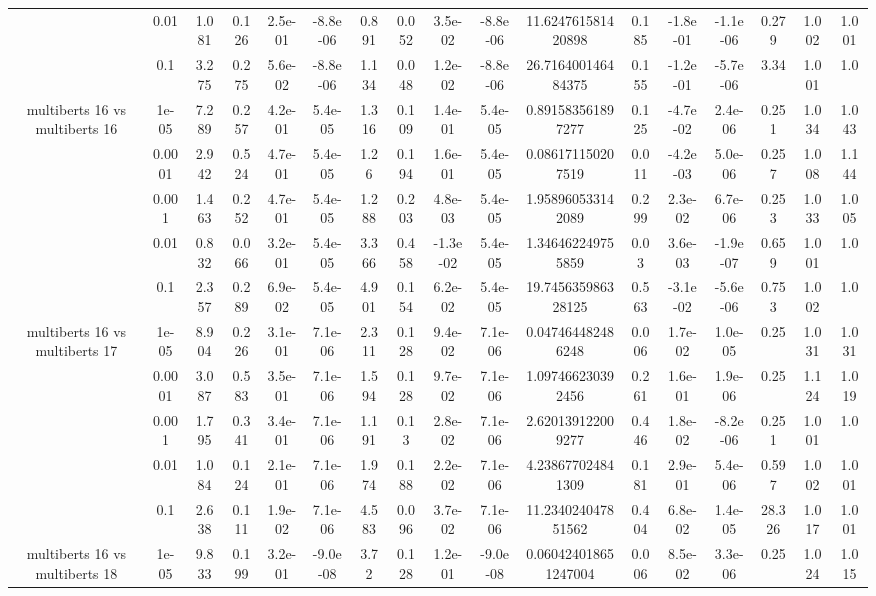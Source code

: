 \begin{tabular}{|c|c|c|c|c|c|c|c|c|c|c|c|c|c|c|c|c|}
 & 0.01 & 1.081 & 0.126 & 2.5e-01 & -8.8e-06 & 0.891 & 0.052 & 3.5e-02 & -8.8e-06 & 11.624761581420898 & 0.185 & -1.8e-01 & -1.1e-06 & 0.279 & 1.002 & 1.001 \\
 & 0.1 & 3.275 & 0.275 & 5.6e-02 & -8.8e-06 & 1.134 & 0.048 & 1.2e-02 & -8.8e-06 & 26.716400146484375 & 0.155 & -1.2e-01 & -5.7e-06 & 3.34 & 1.001 & 1.0 \\
\hline
\multirow{5}{*}{multiberts 16 vs multiberts 16} & 1e-05 & 7.289 & 0.257 & 4.2e-01 & 5.4e-05 & 1.316 & 0.109 & 1.4e-01 & 5.4e-05 & 0.891583561897277 & 0.125 & -4.7e-02 & 2.4e-06 & 0.251 & 1.034 & 1.043 \\
 & 0.0001 & 2.942 & 0.524 & 4.7e-01 & 5.4e-05 & 1.26 & 0.194 & 1.6e-01 & 5.4e-05 & 0.086171150207519 & 0.011 & -4.2e-03 & 5.0e-06 & 0.257 & 1.008 & 1.144 \\
 & 0.001 & 1.463 & 0.252 & 4.7e-01 & 5.4e-05 & 1.288 & 0.203 & 4.8e-03 & 5.4e-05 & 1.958960533142089 & 0.299 & 2.3e-02 & 6.7e-06 & 0.253 & 1.033 & 1.005 \\
 & 0.01 & 0.832 & 0.066 & 3.2e-01 & 5.4e-05 & 3.366 & 0.458 & -1.3e-02 & 5.4e-05 & 1.346462249755859 & 0.03 & 3.6e-03 & -1.9e-07 & 0.659 & 1.001 & 1.0 \\
 & 0.1 & 2.357 & 0.289 & 6.9e-02 & 5.4e-05 & 4.901 & 0.154 & 6.2e-02 & 5.4e-05 & 19.745635986328125 & 0.563 & -3.1e-02 & -5.6e-06 & 0.753 & 1.002 & 1.0 \\
\hline
\multirow{5}{*}{multiberts 16 vs multiberts 17} & 1e-05 & 8.904 & 0.226 & 3.1e-01 & 7.1e-06 & 2.311 & 0.128 & 9.4e-02 & 7.1e-06 & 0.047464482486248 & 0.006 & 1.7e-02 & 1.0e-05 & 0.25 & 1.031 & 1.031 \\
 & 0.0001 & 3.087 & 0.583 & 3.5e-01 & 7.1e-06 & 1.594 & 0.128 & 9.7e-02 & 7.1e-06 & 1.097466230392456 & 0.261 & 1.6e-01 & 1.9e-06 & 0.25 & 1.124 & 1.019 \\
 & 0.001 & 1.795 & 0.341 & 3.4e-01 & 7.1e-06 & 1.191 & 0.13 & 2.8e-02 & 7.1e-06 & 2.620139122009277 & 0.446 & 1.8e-02 & -8.2e-06 & 0.251 & 1.001 & 1.0 \\
 & 0.01 & 1.084 & 0.124 & 2.1e-01 & 7.1e-06 & 1.974 & 0.188 & 2.2e-02 & 7.1e-06 & 4.238677024841309 & 0.181 & 2.9e-01 & 5.4e-06 & 0.597 & 1.002 & 1.001 \\
 & 0.1 & 2.638 & 0.111 & 1.9e-02 & 7.1e-06 & 4.583 & 0.096 & 3.7e-02 & 7.1e-06 & 11.234024047851562 & 0.404 & 6.8e-02 & 1.4e-05 & 28.326 & 1.017 & 1.001 \\
\hline
\multirow{5}{*}{multiberts 16 vs multiberts 18} & 1e-05 & 9.833 & 0.199 & 3.2e-01 & -9.0e-08 & 3.72 & 0.128 & 1.2e-01 & -9.0e-08 & 0.060424018651247004 & 0.006 & 8.5e-02 & 3.3e-06 & 0.25 & 1.024 & 1.015 \\

\end{tabular}
